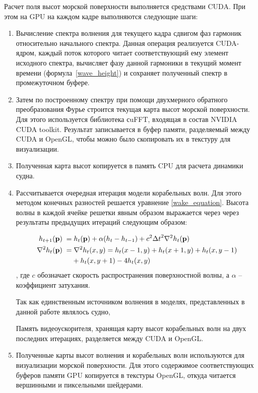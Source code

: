 Расчет поля высот морской поверхности выполняется средствами CUDA. При этом на GPU на каждом кадре выполняются следующие шаги:

\begin{enumerate}
\item Вычисление спектра волнения для текущего кадра сдвигом фаз гармоник относительно начального спектра. Данная операция реализуется CUDA-ядром, каждый поток которого читает соответствующий ему элемент исходного спектра, вычисляет фазу данной гармоники в текущий момент времени (формула~\ref{wave_height}) и сохраняет полученный спектр в промежуточном буфере.

\item Затем по построенному спектру при помощи двухмерного обратного преобразования Фурье строится текущая карта высот морской поверхности. Для этого используется библиотека сuFFT, входящая в состав NVIDIA CUDA toolkit. Результат записывается в буфер памяти, разделяемый между CUDA и OpenGL, чтобы можно было скопировать их в текстуру для визуализации.

\item Полученная карта высот копируется в память CPU для расчета динамики судна.

\item Рассчитывается очередная итерация модели корабельных волн. Для этого методом конечных разностей решается уравнение \ref{wake_equation}. Высота волны в каждой ячейке решетки явным образом выражается через через результаты предыдущих итераций следующим образом: 

\begin{equation}
\begin{split}
h_{t+1}(\mathbf{p}) \; =& \; h_t(\mathbf{p}) + \alpha(h_t - h_{t-1}) +
c^2{\Delta t}^2 \nabla^2 h_t(\mathbf{p}) \\
\nabla^2 h_t(\mathbf{p}) \; =& \; \nabla^2 h_t(x, y) = 
h_t(x-1, y) + h_t(x+1, y) + h_t(x, y-1) \\ &+ h_t(x, y+1) - 4 h_t(x, y)
\end{split}
\end{equation}
, где $c$  обозначает скорость распространения поверхностной волны, а $\alpha$ -- коэффициент затухания.

Так как единственным источником волнения в моделях, представленных в данной работе являлось судно, 

Память видеоускорителя, хранящая карту высот корабельных волн на двух последних итерациях, разделяется между CUDA и OpenGL.

\item Полученные карты высот волнения и корабельных волн используются для визуализации морской поверхности. Для этого содержимое соответствующих буферов памяти GPU копируется в текстуры OpenGL, откуда читается вершинными и пиксельными шейдерами.

\end{enumerate}




